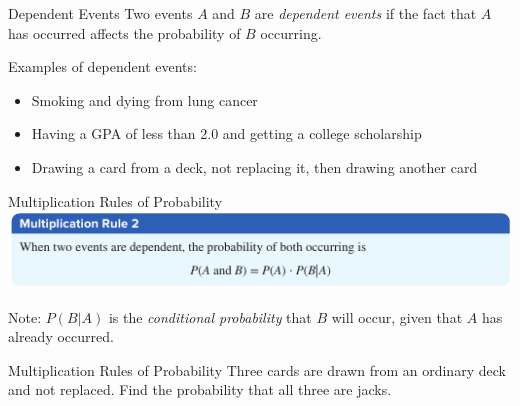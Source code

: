 \documentclass[t, aspectratio=169]{beamer}
\newcommand{\?}{\stackrel{?}{=}}
\begin{document}
	\begin{frame}{Dependent Events}
		Two events $A$ and $B$ are \textit{dependent events} if the fact that $A$ has occurred affects the probability of $B$ occurring. \pause
		
		Examples of dependent events: \begin{itemize}
			\item Smoking and dying from lung cancer
			\item Having a GPA of less than 2.0 and getting a college scholarship
			\item Drawing a card from a deck, not replacing it, then drawing another card
		\end{itemize}
	\end{frame}

	\begin{frame}{Multiplication Rules of Probability}
		\includegraphics[width=\textwidth]{mult-2.png} \pause
		
		Note: $P(B|A)$ is the \textit{conditional probability} that $B$ will occur, given that $A$ has already occurred.
	\end{frame}

	\begin{frame}{Multiplication Rules of Probability}
		Three cards are drawn from an ordinary deck and not replaced. Find the probability that all three are jacks.
		
		\begin{flalign*}
		\end{flalign*}
	\end{frame}
\end{document}
